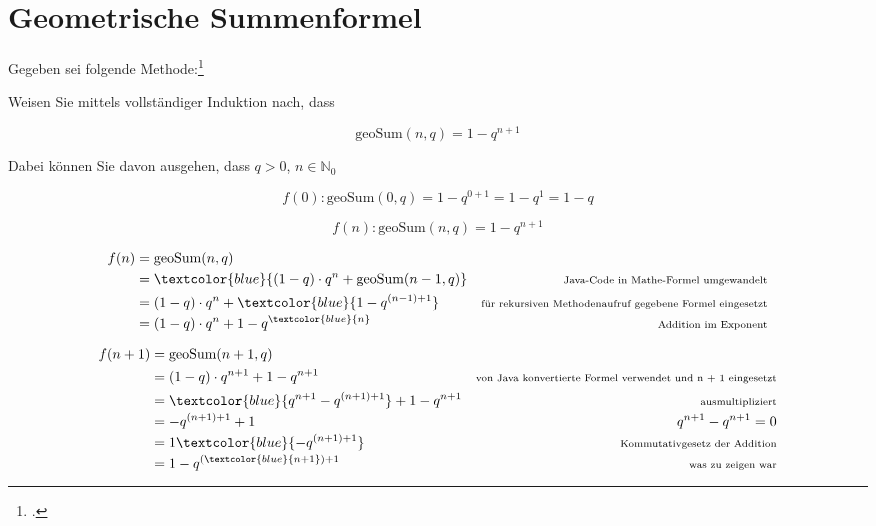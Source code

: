 \documentclass{lehramt-informatik-aufgabe}
\begin{document}
\def\e#1{\scriptsize#1}

\def\et#1{\scriptsize\text{#1}}

\def\m#1{\textcolor{blue}{#1}}

\section{Geometrische Summenformel}

Gegeben sei folgende Methode:\footcite{sosy:e-klausur}


\noindent
Weisen Sie mittels vollständiger Induktion nach, dass

\begin{displaymath}
\text{geoSum}(n,q) = 1 - q^{n+1}
\end{displaymath}

\noindent
Dabei können Sie davon ausgehen, dass $q > 0$, $ n \in \mathbb{N}_0$

\begin{liAntwort}
\liInduktionAnfang

\begin{displaymath}
f(0): \text{geoSum}(0, q) = 1 - q^{0+1} = 1 - q^1 = 1 - q
\end{displaymath}

\liInduktionVoraussetzung

\begin{displaymath}
f(n): \text{geoSum}(n, q) = 1 - q^{n+1}
\end{displaymath}

\liInduktionSchritt

\begin{align*}
f(n)
& = \text{geoSum}(n, q)\\
%
& = \m{(1 - q) \cdot q^n +
    \text{geoSum}(n - 1, q)}
& \et{Java-Code in Mathe-Formel umgewandelt}\\
%
& = (1 - q) \cdot q^n +
    \m{1 - q^{(n - 1) + 1}}
& \et{für rekursiven Methodenaufruf gegebene Formel eingesetzt}\\
%
& = (1 - q) \cdot q^n +
    1 - q^{\m{n}}
& \et{Addition im Exponent}\\
\end{align*}

\begin{align*}
f(n+1)
& = \text{geoSum}(n + 1, q)\\
%
& = (1 - q) \cdot q^{n + 1} +
    1 - q^{n + 1}
& \et{von Java konvertierte Formel verwendet und n + 1 eingesetzt}\\
%
& = \m{q^{n + 1} - q^{(n + 1) + 1}} +
    1 - q^{n + 1}
& \et{ausmultipliziert}\\
%
& = - q^{(n + 1) + 1} + 1
& \e{q^{n + 1} - q^{n + 1} = 0}\\
%
& =  1 \m{- q^{(n + 1) + 1}}
& \et{Kommutativgesetz der Addition}\\
%
& =  1 - q^{(\m{n + 1}) + 1}
& \et{was zu zeigen war}\\
\end{align*}
\end{liAntwort}
\end{document}
